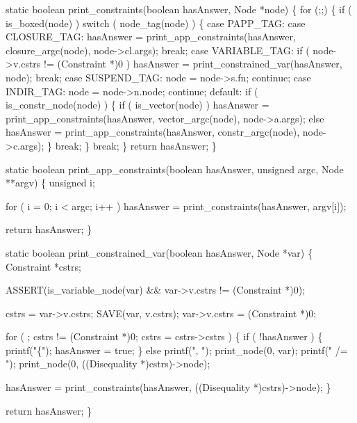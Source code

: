 \nwenddocs{}\plusendmoddef\nwstartdeflinemarkup{}\nwenddeflinemarkup
static boolean
print_constraints(boolean hasAnswer, Node *node)
\{
    for (;;)
    \{
        if ( is_boxed(node) )
            switch ( node_tag(node) )
            \{
            case PAPP_TAG:
            case CLOSURE_TAG:
                hasAnswer = print_app_constraints(hasAnswer,
                                                  closure_argc(node),
                                                  node->cl.args);
                break;
            case VARIABLE_TAG:
                if ( node->v.cstrs != (Constraint *)0 )
                    hasAnswer = print_constrained_var(hasAnswer, node);
                break;
            case SUSPEND_TAG:
                node = node->s.fn;
                continue;
            case INDIR_TAG:
                node = node->n.node;
                continue;
            default:
                if ( is_constr_node(node) )
                \{
                    if ( is_vector(node) )
                        hasAnswer = print_app_constraints(hasAnswer,
                                                          vector_argc(node),
                                                          node->a.args);
                    else
                        hasAnswer = print_app_constraints(hasAnswer,
                                                          constr_argc(node),
                                                          node->c.args);
                \}
                break;
            \}
        break;
    \}
    return hasAnswer;
\}

static boolean
print_app_constraints(boolean hasAnswer, unsigned argc, Node **argv)
\{
    unsigned i;

    for ( i = 0; i < argc; i++ )
        hasAnswer = print_constraints(hasAnswer, argv[i]);

    return hasAnswer;
\}

static boolean
print_constrained_var(boolean hasAnswer, Node *var)
\{
    Constraint *cstrs;

    ASSERT(is_variable_node(var) && var->v.cstrs != (Constraint *)0);

    cstrs = var->v.cstrs;
    SAVE(var, v.cstrs);
    var->v.cstrs = (Constraint *)0;

    for ( ; cstrs != (Constraint *)0; cstrs = cstrs->cstrs )
    \{
        if ( !hasAnswer )
        \{
            printf("\{");
            hasAnswer = true;
        \}
        else
            printf(", ");
        print_node(0, var);
        printf(" /= ");
        print_node(0, ((Disequality *)cstrs)->node);

        hasAnswer = print_constraints(hasAnswer, ((Disequality *)cstrs)->node);
    \}

    return hasAnswer;
\}
\nwendcode{}

%
%

